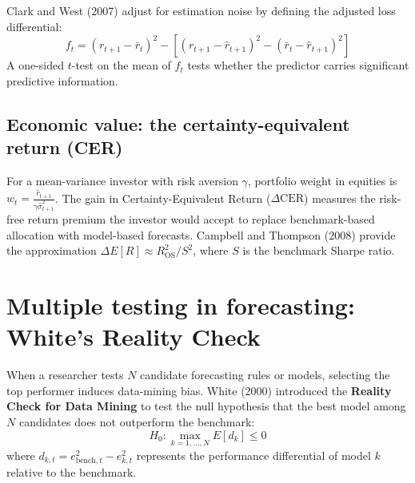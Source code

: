 Clark and West (2007) adjust for estimation noise by defining the adjusted loss differential:
\begin{equation}
  f_t = (r_{t+1} - \bar r_t)^2 - \left[(r_{t+1} - \hat r_{t+1})^2 - (\bar r_t - \hat r_{t+1})^2\right]
  \label{eq:08-cw}
\end{equation}
A one-sided $t$-test on the mean of $f_t$ tests whether the predictor carries significant predictive information.

\subsection{Economic value: the certainty-equivalent return (CER)}
For a mean-variance investor with risk aversion $\gamma$, portfolio weight in equities is $w_t = \frac{\hat{r}_{t+1}}{\gamma \hat{\sigma}^2_{t+1}}$. The gain in Certainty-Equivalent Return ($\Delta \text{CER}$) measures the risk-free return premium the investor would accept to replace benchmark-based allocation with model-based forecasts. Campbell and Thompson (2008) provide the approximation $\Delta E[R] \approx R^2_{\text{OS}} / S^2$, where $S$ is the benchmark Sharpe ratio.

\section{Multiple testing in forecasting: White's Reality Check}
\label{sec:08-reality}

When a researcher tests $N$ candidate forecasting rules or models, selecting the top performer induces data-mining bias. White (2000) introduced the \textbf{Reality Check for Data Mining} to test the null hypothesis that the best model among $N$ candidates does not outperform the benchmark:
\begin{equation}
  H_0: \max_{k=1, \dots, N} E[d_k] \le 0
  \label{eq:08-white-null}
\end{equation}
where $d_{k,t} = e^2_{\text{bench},t} - e^2_{k,t}$ represents the performance differential of model $k$ relative to the benchmark.

